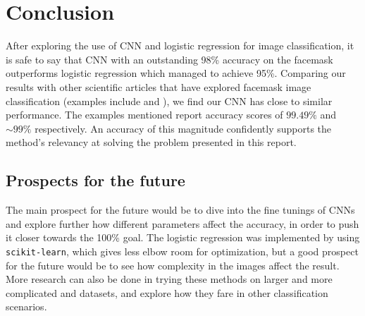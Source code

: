 \documentclass[../main.tex]{subfiles}
\begin{document}
\section{Conclusion}
After exploring the use of CNN and logistic regression for image classification, it is safe to say that CNN with an outstanding 98\% accuracy on the facemask outperforms logistic regression which managed to achieve 95\%. Comparing our results with other scientific articles that have explored facemask image classification (examples include \cite{scientific_article_1} and \cite{scientific_article_2}), we find our CNN has close to similar performance. The examples mentioned report accuracy scores of $99.49\%$ and $\sim99\%$ respectively. An accuracy of this magnitude confidently supports the method's relevancy at solving the problem presented in this report.

\subsection{Prospects for the future}
The main prospect for the future would be to dive into the fine tunings of CNNs and explore further how different parameters affect the accuracy, in order to push it closer towards the 100\% goal. The logistic regression was implemented by using \verb|scikit-learn|, which gives less elbow room for optimization, but a good prospect for the future would be to see how complexity in the images affect the result. More research can also be done in trying these methods on larger and more complicated and datasets, and explore how they fare in other classification scenarios.
\end{document}
